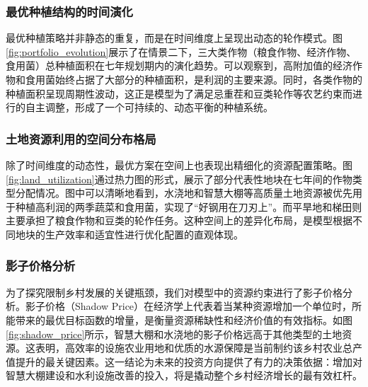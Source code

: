 \subsubsection{最优种植结构的时间演化}

最优种植策略并非静态的重复，而是在时间维度上呈现出动态的轮作模式。图\ref{fig:portfolio_evolution}展示了在情景二下，三大类作物（粮食作物、经济作物、食用菌）总种植面积在七年规划期内的演化趋势。可以观察到，高附加值的经济作物和食用菌始终占据了大部分的种植面积，是利润的主要来源。同时，各类作物的种植面积呈现周期性波动，这正是模型为了满足忌重茬和豆类轮作等农艺约束而进行的自主调整，形成了一个可持续的、动态平衡的种植系统。


\subsubsection{土地资源利用的空间分布格局}

除了时间维度的动态性，最优方案在空间上也表现出精细化的资源配置策略。图\ref{fig:land_utilization}通过热力图的形式，展示了部分代表性地块在七年间的作物类型分配情况。图中可以清晰地看到，水浇地和智慧大棚等高质量土地资源被优先用于种植高利润的两季蔬菜和食用菌，实现了“好钢用在刀刃上”。而平旱地和梯田则主要承担了粮食作物和豆类的轮作任务。这种空间上的差异化布局，是模型根据不同地块的生产效率和适宜性进行优化配置的直观体现。


\subsubsection{影子价格分析}

为了探究限制乡村发展的关键瓶颈，我们对模型中的资源约束进行了影子价格分析。影子价格（Shadow Price）在经济学上代表着当某种资源增加一个单位时，所能带来的最优目标函数的增量，是衡量资源稀缺性和经济价值的有效指标。如图\ref{fig:shadow_price}所示，智慧大棚和水浇地的影子价格远高于其他类型的土地资源。这表明，高效率的设施农业用地和优质的水源保障是当前制约该乡村农业总产值提升的最关键因素。这一结论为未来的投资方向提供了有力的决策依据：增加对智慧大棚建设和水利设施改善的投入，将是撬动整个乡村经济增长的最有效杠杆。

